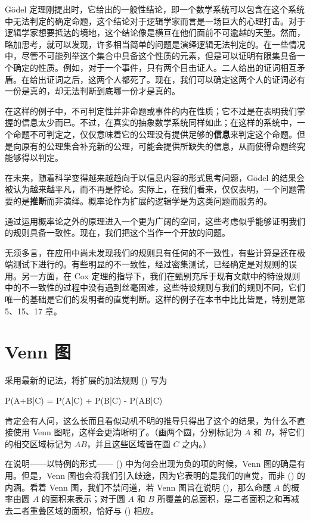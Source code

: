 G\"odel 定理刚提出时，它给出的一般性结论，即一个数学系统可以包含在这个系统中无法判定的确定命题，这个结论对于逻辑学家而言是一场巨大的心理打击。对于逻辑学家想要抵达的境地，这个结论像是横亘在他们面前不可逾越的天堑。然而，略加思考，就可以发现，许多相当简单的问题是演绎逻辑无法判定的。在一些情况中，尽管不可能列举这个集合中具备这个性质的元素，但是可以证明有限集具备一个确定的性质。例如，对于一个事件，只有两个目击证人。二人给出的证词相互矛盾。在给出证词之后，这两个人都死了。现在，我们可以确定这两个人的证词必有一份是真的，却无法判断到底哪一份才是真的。

在这样的例子中，不可判定性并非命题或事件的内在性质；它不过是在表明我们掌握的信息太少而已。不过，在真实的抽象数学系统同样如此；在这样的系统中，一个命题不可判定之，仅仅意味着它的公理没有提供足够的{\bf 信息}来判定这个命题。但是向原有的公理集合补充新的公理，可能会提供所缺失的信息，从而使得命题终究能够得以判定。

在未来，随着科学变得越来越趋向于以信息内容的形式思考问题，G\"odel 的结果会被认为越来越平凡，而不再是悖论。实际上，在我们看来，仅仅表明，一个问题需要的是{\bf 推断}而非演绎。概率论作为扩展的逻辑学是为这类问题而服务的。

通过运用概率论之外的原理进入一个更为广阔的空间，这些考虑似乎能够证明我们的规则具备一致性。现在，我们把这个当作一个开放的问题。

无须多言，在应用中尚未发现我们的规则具有任何的不一致性，有些计算是还在极端测试下进行的。有些明显的不一致性，经过密集测试，已经确定是对规则的误用。另一方面，在 Cox 定理的指导下，我们在甄别充斥于现有文献中的特设规则中的不一致性的过程中没有遇到丝毫困难，这些特设规则与我们的规则不同，它们唯一的基础是它们的发明者的直觉判断。这样的例子在本书中比比皆是，特别是第 5、15、17 章。

\section{Venn 图}

采用最新的记法，将扩展的加法规则 (\in[2-66]) 写为

\placeformula[2-104]
\startformula
P(A+B|C) = P(A|C) + P(B|C) - P(AB|C)
\stopformula

肯定会有人问，这么长而且看似动机不明的推导只得出了这个的结果，为什么不直接使用 Venn 图呢，这样会更清晰明了。（画两个圆，分别标记为 $A$ 和 $B$，将它们的相交区域标记为 $AB$，并且这些区域皆在圆 $C$ 之内。）

在说明——以特例的形式—— (\in[2-104]) 中为何会出现为负的项的时候，Venn 图的确是有用。但是，Venn 图也会将我们引入歧途，因为它表明的是我们的直觉，而非 (\in[2-104]) 的内涵。看着 Venn 图，我们不禁问道，若 Venn 图旨在说明 (\in[2-104])，那么命题 $A$ 的概率由圆 $A$ 的面积来表示；对于圆 $A$ 和 $B$ 所覆盖的总面积，是二者面积之和再减去二者重叠区域的面积，恰好与 (\in[2-104]) 相应。


